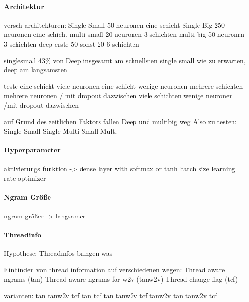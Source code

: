             \paragraph{Architektur}
                versch architekturen:
                Single Small 50 neuronen eine schicht
                Single Big 250 neuronen eine schicht
                multi small 20 neuronen 3 schichten
                multi big 50 neuronrn 3 schichten
                deep erste 50 sonst 20 6 schichten

                singlesmall 43\% von Deep
                insgesamt am schnellsten single small
                wie zu erwarten,  deep am langsamsten

                teste eine schicht viele neuronen 
                eine schicht wenige neuronen
                mehrere schichten mehrere neuronen / mit dropout dazwischen
                viele schichten wenige neuronen /mit dropout dazwischen

                auf Grund des zeitlichen Faktors fallen Deep und multibig weg
                Also zu testen:
                Single Small
                Single 
                Multi Small
                Multi 

            \paragraph{Hyperparameter}
                aktivierungs funktion
                -> dense layer with softmax or tanh
                batch size
                learning rate
                optimizer

            \paragraph{Ngram Größe}
                ngram größer -> langsamer

            \paragraph{Threadinfo}
                Hypothese:
                Threadinfos bringen was

                Einbinden von thread information auf verschiedenen wegen:
                Thread aware ngrams (tan)
                Thread aware ngrams for w2v (tanw2v)
                Thread change flag (tcf)

                varianten:
                tan
                tanw2v
                tcf
                tan tcf
                tan tanw2v
                tcf tanw2v
                tan tanw2v tcf


